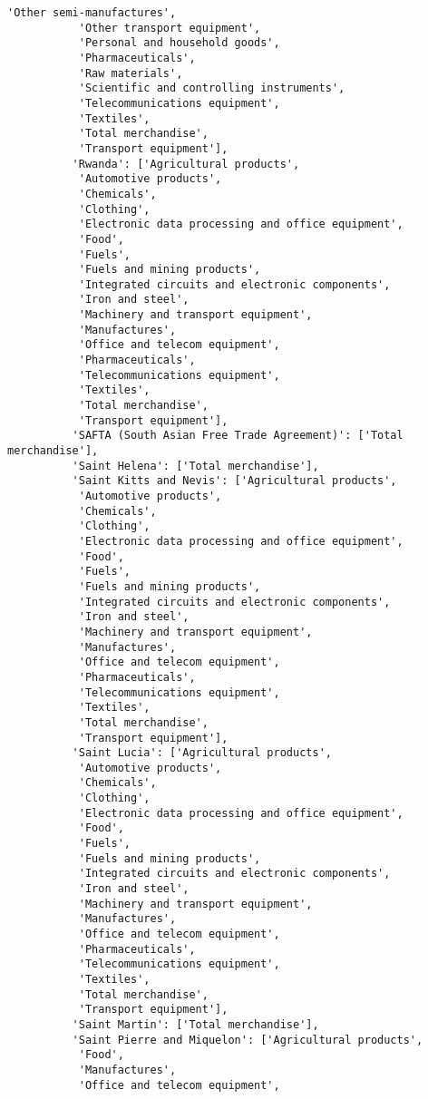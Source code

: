 \documentclass[11pt]{article}
\begin{document}
\begin{Verbatim}[commandchars=\\\{\}]
           'Other semi-manufactures',
           'Other transport equipment',
           'Personal and household goods',
           'Pharmaceuticals',
           'Raw materials',
           'Scientific and controlling instruments',
           'Telecommunications equipment',
           'Textiles',
           'Total merchandise',
           'Transport equipment'],
          'Rwanda': ['Agricultural products',
           'Automotive products',
           'Chemicals',
           'Clothing',
           'Electronic data processing and office equipment',
           'Food',
           'Fuels',
           'Fuels and mining products',
           'Integrated circuits and electronic components',
           'Iron and steel',
           'Machinery and transport equipment',
           'Manufactures',
           'Office and telecom equipment',
           'Pharmaceuticals',
           'Telecommunications equipment',
           'Textiles',
           'Total merchandise',
           'Transport equipment'],
          'SAFTA (South Asian Free Trade Agreement)': ['Total merchandise'],
          'Saint Helena': ['Total merchandise'],
          'Saint Kitts and Nevis': ['Agricultural products',
           'Automotive products',
           'Chemicals',
           'Clothing',
           'Electronic data processing and office equipment',
           'Food',
           'Fuels',
           'Fuels and mining products',
           'Integrated circuits and electronic components',
           'Iron and steel',
           'Machinery and transport equipment',
           'Manufactures',
           'Office and telecom equipment',
           'Pharmaceuticals',
           'Telecommunications equipment',
           'Textiles',
           'Total merchandise',
           'Transport equipment'],
          'Saint Lucia': ['Agricultural products',
           'Automotive products',
           'Chemicals',
           'Clothing',
           'Electronic data processing and office equipment',
           'Food',
           'Fuels',
           'Fuels and mining products',
           'Integrated circuits and electronic components',
           'Iron and steel',
           'Machinery and transport equipment',
           'Manufactures',
           'Office and telecom equipment',
           'Pharmaceuticals',
           'Telecommunications equipment',
           'Textiles',
           'Total merchandise',
           'Transport equipment'],
          'Saint Martin': ['Total merchandise'],
          'Saint Pierre and Miquelon': ['Agricultural products',
           'Food',
           'Manufactures',
           'Office and telecom equipment',

\end{Verbatim}
\end{document}
